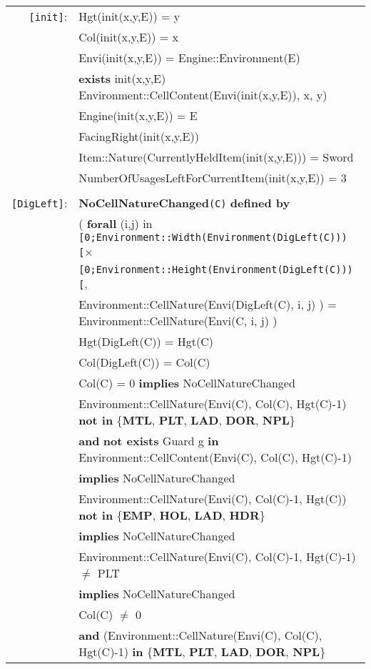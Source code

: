 \documentclass[7pt]{article}
\begin{document}
\begin{tabular}{rl}
\texttt{[init]}: & Hgt(init(x,y,E)) = y\\
& Col(init(x,y,E)) = x \\
& Envi(init(x,y,E)) = Engine::Environment(E) \\
& \textbf{exists} init(x,y,E) Environment::CellContent(Envi(init(x,y,E)), x, y) \\
& Engine(init(x,y,E)) = E \\
& FacingRight(init(x,y,E)) \\
& Item::Nature(CurrentlyHeldItem(init(x,y,E))) = Sword \\
& NumberOfUsagesLeftForCurrentItem(init(x,y,E)) = 3 \\ \\



\texttt{[DigLeft]}:& \textbf{NoCellNatureChanged}\texttt{(C)} \textbf{defined by} \\ 
&\quad\quad ( {\textbf{forall}} (i,j) {in} \texttt{[0;Environment::Width(Environment(DigLeft(C)))[}× \\ & \quad\quad\quad\quad\quad\quad\quad\quad\quad \texttt{[0;Environment::Height(Environment(DigLeft(C)))[}, \\
       & \quad\quad\quad\quad\quad\quad Environment::CellNature(Envi(DigLeft(C), i, j) ) = Environment::CellNature(Envi(C, i, j) ) \\
& Hgt(DigLeft(C)) = Hgt(C) \\
& Col(DigLeft(C)) = Col(C) \\
& Col(C) = 0 \textbf{implies} NoCellNatureChanged \\
& Environment::CellNature(Envi(C), Col(C), Hgt(C)-1) \textbf{not in} \{\textbf{MTL}, \textbf{PLT}, \textbf{LAD}, \textbf{DOR}, \textbf{NPL}\} \\
& \quad \textbf{and} \textbf{not exists} Guard g \textbf{in} Environment::CellContent(Envi(C), Col(C), Hgt(C)-1) \\
& \quad \textbf{implies} NoCellNatureChanged \\
& Environment::CellNature(Envi(C), Col(C)-1, Hgt(C)) \textbf{not in} \{\textbf{EMP}, \textbf{HOL}, \textbf{LAD}, \textbf{HDR}\} \\
& \quad \textbf{implies} NoCellNatureChanged \\
& Environment::CellNature(Envi(C), Col(C)-1, Hgt(C)-1) $\neq$ PLT \\
& \quad \textbf{implies} NoCellNatureChanged \\
& Col(C) $\neq$ 0 \\
& \quad \textbf{and} (Environment::CellNature(Envi(C), Col(C), Hgt(C)-1) \textbf{in} \{\textbf{MTL}, \textbf{PLT}, \textbf{LAD}, \textbf{DOR}, \textbf{NPL}\} \\

\end{tabular}
\end{document}
